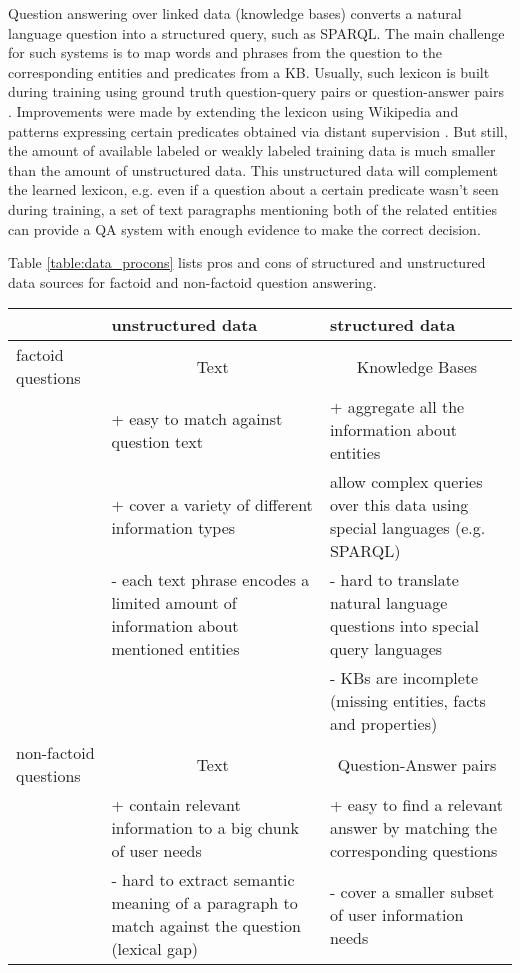 Question answering over linked data (knowledge bases) converts a natural language question into a structured query, such as SPARQL.
The main challenge for such systems is to map words and phrases from the question to the corresponding entities and predicates from a KB.
Usually, such lexicon is built during training using ground truth question-query pairs \cite{CaiY13} or question-answer pairs \cite{BerantCFL13:sempre}.
Improvements were made by extending the lexicon using Wikipedia and patterns expressing certain predicates obtained via distant supervision \cite{bastmore:cikm:2015:aquu,BordesCW14:emnlp,ReddyLS14,yih:ACL:2015:STAGG,YaoD14}.
But still, the amount of available labeled or weakly labeled training data is much smaller than the amount of unstructured data.
This unstructured data will complement the learned lexicon, e.g. even if a question about a certain predicate wasn't seen during training, a set of text paragraphs mentioning both of the related entities can provide a QA system with enough evidence to make the correct decision.

Table \ref{table:data_procons} lists pros and cons of structured and unstructured data sources for factoid and non-factoid question answering.

\begin{table*}
\centering
\caption{Pros and cons of structured and unstructured data sources for factoid and non-factoid question answering}
\begin{tabular}{| l | p{6cm} | p{6cm} |}
\hline
 & unstructured data & structured data \\
\hline
factoid questions & \multicolumn{1}{|c|}{Text} & \multicolumn{1}{|c|}{Knowledge Bases} \\
 & + easy to match against question text & + aggregate all the information about entities\\
 & + cover a variety of different information types & allow complex queries over this data using special languages (e.g. SPARQL) \\
 & - each text phrase encodes a limited amount of information about mentioned entities & - hard to translate natural language questions into special query languages \\
&  & - KBs are incomplete (missing entities, facts and properties) \\
\hline
non-factoid questions & \multicolumn{1}{|c|}{Text} & \multicolumn{1}{|c|}{Question-Answer pairs} \\
 & + contain relevant information to a big chunk of user needs & + easy to find a relevant answer by matching the corresponding questions \\
 & - hard to extract semantic meaning of a paragraph to match against the question (lexical gap) & - cover a smaller subset of user information needs \\
\hline
\end{tabular}
\label{table:data_procons}
\end{table*}


